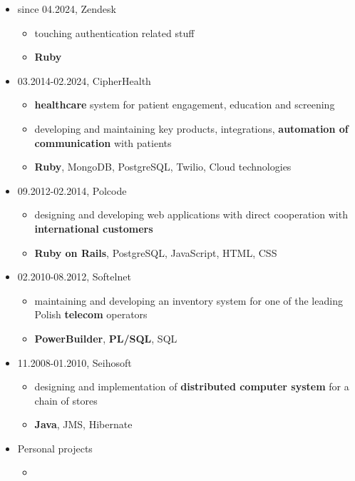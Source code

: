 \documentclass[a4paper]{article}
\begin{document}
\begin{itemize}
  \item
  since 04.2024,
  Zendesk
  \begin{itemize}
    \item
      touching authentication related stuff
    \item
      \textbf{Ruby}
  \end{itemize}
  \item
  03.2014-02.2024,
  CipherHealth
  \begin{itemize}
    \item
      \textbf{healthcare} system for patient engagement, education and screening
    \item
      developing and maintaining key products, integrations, \textbf{automation of communication} with patients
    \item
      \textbf{Ruby}, MongoDB, PostgreSQL, Twilio, Cloud technologies
  \end{itemize}
  \item
    09.2012-02.2014,
    Polcode
    \begin{itemize}
      \item
        designing and developing web applications with direct cooperation with \textbf{international customers}
      \item
        \textbf{Ruby on Rails}, PostgreSQL, JavaScript, HTML, CSS
    \end{itemize}
  \item
    02.2010-08.2012,
    Softelnet
    \begin{itemize}
      \item
        maintaining and developing an inventory system
        for one of the leading Polish \textbf{telecom} operators
      \item
        \textbf{PowerBuilder}, \textbf{PL/SQL}, SQL
    \end{itemize}
  \item
    11.2008-01.2010,
    Seihosoft
    \begin{itemize}
      \item
        designing and implementation of \textbf{distributed computer system}
        for a chain of stores
      \item
        \textbf{Java}, JMS, Hibernate
    \end{itemize}
  \item
    Personal projects
    \begin{itemize}
      \item

\end{itemize}
\end{itemize}
\end{document}
